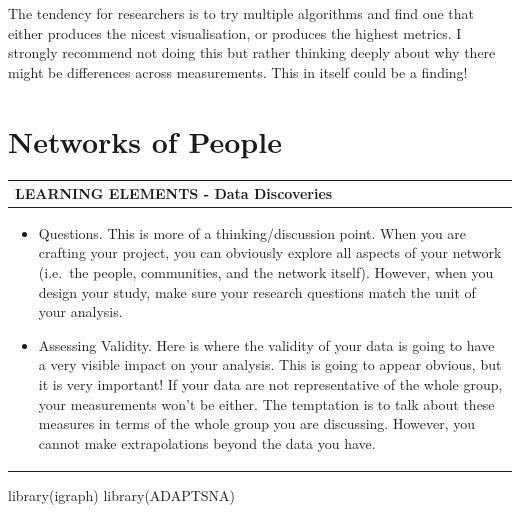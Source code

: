 \documentclass[
  letterpaper,
  DIV=11,
  numbers=noendperiod]{scrreprt}
\newenvironment{Shaded}{\begin{snugshade}}{\end{snugshade}}
\newcommand{\FunctionTok}[1]{\textcolor[rgb]{0.28,0.35,0.67}{#1}}
\newcommand{\NormalTok}[1]{\textcolor[rgb]{0.00,0.23,0.31}{#1}}
\begin{document}
The tendency for researchers is to try multiple algorithms and find one
that either produces the nicest visualisation, or produces the highest
metrics. I strongly recommend not doing this but rather thinking deeply
about why there might be differences across measurements. This in itself
could be a finding!

\chapter{Networks of People}\label{networks-of-people}

\begin{longtable}[]{@{}
  >{\raggedright\arraybackslash}p{}@{}}
\toprule\noalign{}
\begin{minipage}[b]{\linewidth}\raggedright
LEARNING ELEMENTS - Data Discoveries
\end{minipage} \\
\midrule\noalign{}
\endhead
\bottomrule\noalign{}
\endlastfoot
\begin{minipage}[t]{\linewidth}\raggedright
\begin{itemize}
\item
  Questions. This is more of a thinking/discussion point. When you are
  crafting your project, you can obviously explore all aspects of your
  network (i.e.~the people, communities, and the network itself).
  However, when you design your study, make sure your research questions
  match the unit of your analysis.
\item
  Assessing Validity. Here is where the validity of your data is going
  to have a very visible impact on your analysis. This is going to
  appear obvious, but it is very important! If your data are not
  representative of the whole group, your measurements won't be either.
  The temptation is to talk about these measures in terms of the whole
  group you are discussing. However, you cannot make extrapolations
  beyond the data you have.
\end{itemize}
\end{minipage} \\
\end{longtable}

\begin{Shaded}
\begin{Highlighting}[]
\FunctionTok{library}\NormalTok{(igraph)}
\FunctionTok{library}\NormalTok{(ADAPTSNA)}
\end{Highlighting}
\end{Shaded}
\end{document}
